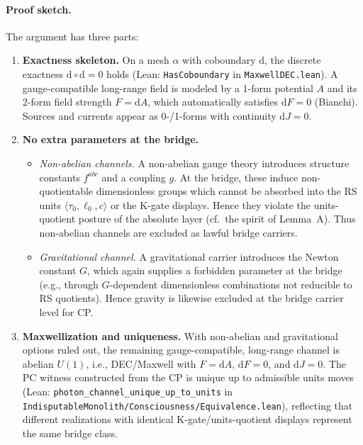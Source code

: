 \documentclass[12pt,a4paper]{article}
\begin{document}
\paragraph{Proof sketch.}
The argument has three parts:
\begin{enumerate}
  \item \textbf{Exactness skeleton.} On a mesh \(\alpha\) with coboundary \(\mathrm{d}\), the discrete exactness \(\mathrm{d}\circ \mathrm{d}=0\) holds (Lean: \texttt{HasCoboundary} in \texttt{MaxwellDEC.lean}). A gauge-compatible long-range field is modeled by a 1-form potential \(A\) and its 2-form field strength \(F=\mathrm{d}A\), which automatically satisfies \(\mathrm{d}F=0\) (Bianchi). Sources and currents appear as 0-/1-forms with continuity \(\mathrm{d}J=0\).
  \item \textbf{No extra parameters at the bridge.} 
    \begin{itemize}
      \item \emph{Non-abelian channels.} A non-abelian gauge theory introduces structure constants \(f^{abc}\) and a coupling \(g\). At the bridge, these induce non-quotientable dimensionless groups which cannot be absorbed into the RS units \(\langle\tau_0,\ell_0,c\rangle\) or the K-gate displays. Hence they violate the units-quotient posture of the absolute layer (cf.\ the spirit of Lemma~A). Thus non-abelian channels are excluded as lawful bridge carriers.
      \item \emph{Gravitational channel.} A gravitational carrier introduces the Newton constant \(G\), which again supplies a forbidden parameter at the bridge (e.g., through \(G\)-dependent dimensionless combinations not reducible to RS quotients). Hence gravity is likewise excluded at the bridge carrier level for CP.
    \end{itemize}
  \item \textbf{Maxwellization and uniqueness.}
    With non-abelian and gravitational options ruled out, the remaining gauge-compatible, long-range channel is abelian \(U(1)\), i.e., DEC/Maxwell with \(F=\mathrm{d}A\), \(\mathrm{d}F=0\), and \(\mathrm{d}J=0\). The PC witness constructed from the CP is unique up to admissible units moves (Lean: \texttt{photon\_channel\_unique\_up\_to\_units} in \texttt{IndisputableMonolith/Consciousness/Equivalence.lean}), reflecting that different realizations with identical K-gate/units-quotient displays represent the same bridge class.
\end{enumerate}
\end{document}
